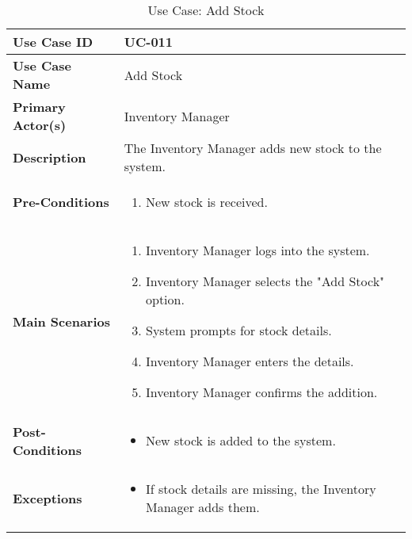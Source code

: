 \documentclass{article}
\begin{document}
\begin{table}[!ht]
    \centering
    \renewcommand{\arraystretch}{1.3}
    \begin{tabularx}{\textwidth}{|l|X|}
        \hline
        \textbf{Use Case ID} & UC-011 \\
        \hline
        \textbf{Use Case Name} & Add Stock \\
        \hline
        \textbf{Primary Actor(s)} & Inventory Manager \\
        \hline
        \textbf{Description} & The Inventory Manager adds new stock to the system. \\
        \hline
        \textbf{Pre-Conditions} & 
        \begin{enumerate}[label=\arabic*.,itemsep=0pt]
            \item New stock is received.
        \end{enumerate} \\
        \hline
        \textbf{Main Scenarios} & 
        \begin{enumerate}[label=\arabic*.,itemsep=0pt]
            \item Inventory Manager logs into the system.
            \item Inventory Manager selects the "Add Stock" option.
            \item System prompts for stock details.
            \item Inventory Manager enters the details.
            \item Inventory Manager confirms the addition.
        \end{enumerate} \\
        \hline
        \textbf{Post-Conditions} & 
        \begin{itemize}[label=--,itemsep=0pt]
            \item New stock is added to the system.
        \end{itemize} \\
        \hline
        \textbf{Exceptions} & 
        \begin{itemize}[label=--,itemsep=0pt]
            \item If stock details are missing, the Inventory Manager adds them.
        \end{itemize} \\
        \hline
    \end{tabularx}
    \caption{Use Case: Add Stock}
    \label{tab:use-case-add-stock}
\end{table}
\end{document}
